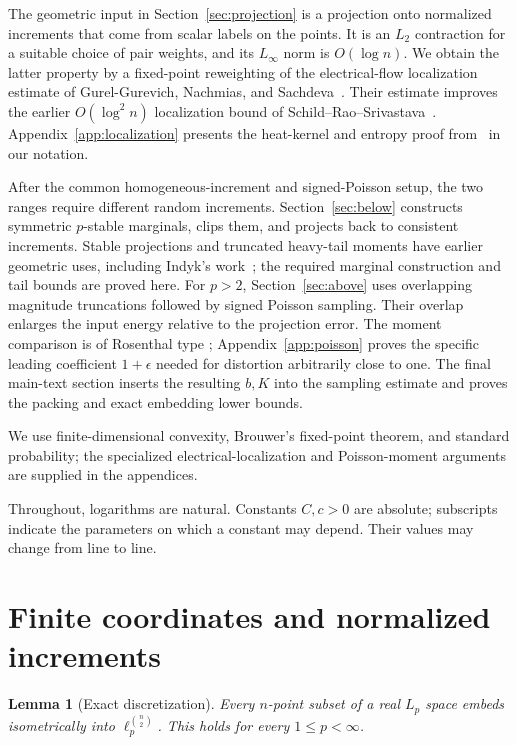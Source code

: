 \documentclass[11pt]{article}
\newtheorem{lemma}[theorem]{Lemma}
\theoremstyle{remark}
\numberwithin{equation}{section}
\begin{document}
The geometric input in Section~\ref{sec:projection} is a projection
onto normalized increments that come from scalar labels on the
points. It is an $L_2$ contraction for a suitable choice of pair
weights, and its $L_\infty$ norm is $O(\log n)$.
We obtain the latter property by a fixed-point reweighting of the
electrical-flow localization estimate of Gurel-Gurevich, Nachmias,
and Sachdeva~\cite[Theorem~1.3]{GGNS}.
Their estimate improves the earlier $O(\log^2 n)$ localization bound
of Schild--Rao--Srivastava~\cite[Theorem~1.5, preprint version]{SRS18}.
Appendix~\ref{app:localization} presents the heat-kernel and entropy
proof from~\cite[Sections~2--4]{GGNS} in our notation.

After the common homogeneous-increment and signed-Poisson setup,
the two ranges require different random increments.
Section~\ref{sec:below} constructs symmetric $p$-stable marginals,
clips them, and projects back to consistent increments.
Stable projections and truncated heavy-tail moments have earlier
geometric uses, including Indyk's work~\cite{Indyk06};
the required marginal construction and tail bounds are proved here.
For $p>2$, Section~\ref{sec:above} uses overlapping magnitude
truncations followed by signed Poisson sampling. Their overlap
enlarges the input energy relative to the projection error.
The moment comparison is of Rosenthal type
\cite{Rosenthal70,Pinelis15}; Appendix~\ref{app:poisson} proves the
specific leading coefficient $1+\epsilon$ needed for distortion
arbitrarily close to one. The final main-text section inserts the resulting
$b,K$ into the sampling estimate and proves the packing and exact
embedding lower bounds.

We use finite-dimensional convexity, Brouwer's fixed-point theorem,
and standard probability; the specialized electrical-localization and
Poisson-moment arguments are supplied in the appendices.

Throughout, logarithms are natural. Constants $C,c>0$ are absolute;
subscripts indicate the parameters on which a constant may depend.
Their values may change from line to line.

\section{Finite coordinates and normalized increments}

\begin{lemma}[Exact discretization]\label{lem:exact-upper}
Every $n$-point subset of a real $L_p$ space embeds isometrically into
$\ell_p^{\binom n2}$. This holds for every $1\le p<\infty$.
\end{lemma}
\end{document}
